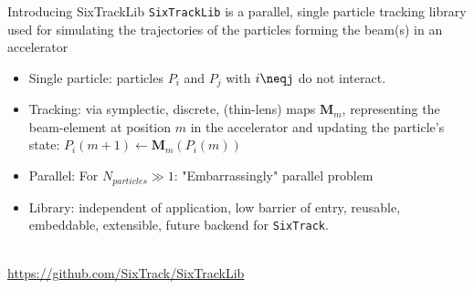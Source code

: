 \documentclass{beamer}
\begin{document}

\begin{frame}{Introducing SixTrackLib}
\texttt{SixTrackLib} is a parallel, single particle tracking library used for simulating the trajectories of the particles forming the beam(s) in an accelerator\\[0.3cm]
\begin{itemize}
    \item Single particle: particles $P_i$ and $P_j$ with $i\neqj$ do not interact. 
    \item Tracking: via symplectic, discrete, (thin-lens) maps $\bm{M}_m$, representing the beam-element at position $m$ in the accelerator and updating the particle's state: $ P_i\left(m + 1\right) \leftarrow \bm{M}_m\left(P_i\left(m \right) \right)$
    \item Parallel: For $N_{particles} \gg 1$: "Embarrassingly" parallel problem
    \item Library: independent of application, low barrier of entry, reusable, embeddable, extensible, future backend for \texttt{SixTrack}.
\end{itemize}
\\[0.3cm]
\underline{https://github.com/SixTrack/SixTrackLib}
\end{frame}
\end{document}
